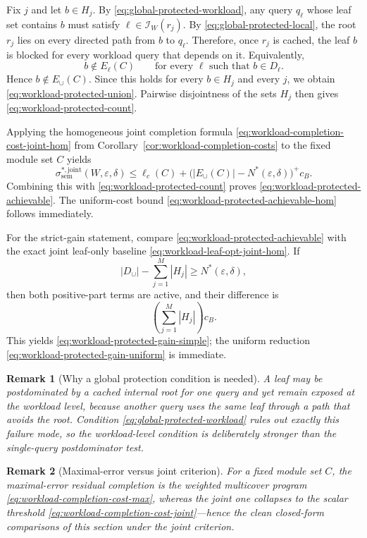 \documentclass[journal]{IEEEtran}
\makeatletter
\newtheorem{remark}{Remark}[section]
\numberwithin{equation}{section}
\renewenvironment{proof}[1][\proofname]{\par
  \pushQED{\qed}%
  \normalfont \topsep6\p@\@plus6\p@\relax
  \trivlist
  \item[\hskip\labelsep
        \itshape
    #1\@addpunct{.}]\ignorespaces
}{%
  \popQED\endtrivlist\@endpefalse
}
\makeatother
\begin{document}
\begin{proof}
Fix \(j\) and let \(b\in H_j\).  By \eqref{eq:global-protected-workload}, any
query \(q_\ell\) whose leaf set contains \(b\) must satisfy
\(\ell\in\mathcal I_W(r_j)\).  By \eqref{eq:global-protected-local}, the root
\(r_j\) lies on every directed path from \(b\) to \(q_\ell\).  Therefore, once
\(r_j\) is cached, the leaf \(b\) is blocked for every workload query that
depends on it.  Equivalently,
\[
  b\notin E_\ell(C)
  \qquad
  \text{for every }\ell\text{ such that }b\in D_\ell.
\]
Hence \(b\notin E_{\cup}(C)\).  Since this holds for every \(b\in H_j\) and
every \(j\), we obtain \eqref{eq:workload-protected-union}.  Pairwise
disjointness of the sets \(H_j\) then gives
\eqref{eq:workload-protected-count}.

Applying the homogeneous joint completion formula
\eqref{eq:workload-completion-cost-joint-hom} from
Corollary~\ref{cor:workload-completion-costs} to the fixed module set \(C\)
yields
\[
  \sigma_{\mathrm{sem}}^{*,\mathrm{joint}}(W,\varepsilon,\delta)
  \le
  \ell_c(C)
  +
  \bigl(
    |E_{\cup}(C)|-N^*(\varepsilon,\delta)
  \bigr)^+c_B.
\]
Combining this with \eqref{eq:workload-protected-count} proves
\eqref{eq:workload-protected-achievable}.  The uniform-cost bound
\eqref{eq:workload-protected-achievable-hom} follows immediately.

For the strict-gain statement, compare
\eqref{eq:workload-protected-achievable} with the exact joint leaf-only
baseline \eqref{eq:workload-leaf-opt-joint-hom}.  If
\[
  |D_{\cup}|-\sum_{j=1}^{M}|H_j|
  \ge
  N^*(\varepsilon,\delta),
\]
then both positive-part terms are active, and their difference is
\[
  \left(\sum_{j=1}^{M}|H_j|\right)c_B.
\]
This yields \eqref{eq:workload-protected-gain-simple}; the uniform reduction
\eqref{eq:workload-protected-gain-uniform} is immediate.
\end{proof}

\begin{remark}[Why a global protection condition is needed]
\label{rem:workload-global-protection}
A leaf may be postdominated by a cached internal root for one query and yet
remain exposed at the workload level, because another query uses the same
leaf through a path that avoids the root.  Condition
\eqref{eq:global-protected-workload} rules out exactly this failure mode,
so the workload-level condition is deliberately stronger than the
single-query postdominator test.
\end{remark}

\begin{remark}[Maximal-error versus joint criterion]
\label{rem:max-vs-joint-workload}
For a fixed module set \(C\), the maximal-error residual completion is the
weighted multicover program \eqref{eq:workload-completion-cost-max}, whereas
the joint one collapses to the scalar threshold
\eqref{eq:workload-completion-cost-joint}---hence the clean closed-form
comparisons of this section under the joint criterion.
\end{remark}
\end{document}
